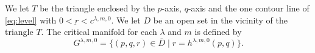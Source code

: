\documentclass[a4paper,11pt]{article}
\begin{document}
We let $T$ be the triangle enclosed by the $p$-axis, $q$-axis and the one contour line of \eqref{eq:level} with $0<\underbar{r} < c^{\lambda,m,0}$. We let $D$ be an open set in the vicinity of the triangle $T$. The critical manifold for each $\lambda$ and $m$ is defined by 
\begin{equation}
 G^{\lambda,m,0} = \{(p,q,r) \in \bar{D} \;|\; r=h^{\lambda,m,0}(p,q)\}.
\end{equation}




% 
% 
% 
\end{document}
